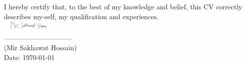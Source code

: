 \documentclass[a4paper]{twentysecondcv} %
\begin{document}

I hereby certify that, to the best of my knowledge and belief, this CV correctly\\ describes my-self, my qualification and experiences.\\

\includegraphics[height=20px,width=100px]{signature.jpg}\\
------------------------------\\
(Mir Sakhawat Hossain)\\
Date: \today


\end{document}
